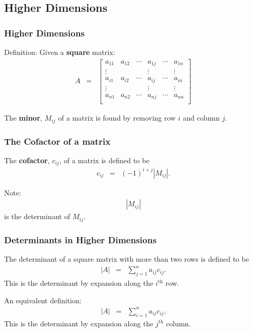 \subsection{Higher Dimensions}

\begin{frame}
  \frametitle{Higher Dimensions}

  Definition: Given a \textbf{square} matrix:
  \begin{eqnarray*}
    A & = & 
    \left[
      \begin{array}{rrr|r|rr}
        a_{11} & a_{12} & \cdots & a_{1j} & \cdots & a_{1n} \\
        \vdots &       &        & \vdots &        & \vdots \\ \hline
        a_{i1} & a_{i2} & \cdots & a_{ij} & \cdots & a_{in} \\ \hline
        \vdots &       &        & \vdots &        & \vdots \\
        a_{n1} & a_{n2} & \cdots & a_{nj} & \cdots & a_{nn} \\
      \end{array}
    \right]
  \end{eqnarray*}

  The \textbf{minor}, $M_{ij}$ of a matrix is found by removing row
  $i$ and column $j$.

\end{frame}


\begin{frame}
  \frametitle{The Cofactor of a matrix}

  The \textbf{cofactor}, $c_{ij}$, of a matrix is defined to be 
  \begin{eqnarray*}
    c_{ij} & = & (-1)^{i+j}\left| M_{ij} \right|.
  \end{eqnarray*}

  Note:
  \begin{eqnarray*}
    \left| M_{ij} \right|
  \end{eqnarray*}
  is the determinant of $M_{ij}$.

\end{frame}


\begin{frame}
  \frametitle{Determinants in Higher Dimensions}

  The determinant of a square matrix with more than two rows is
  defined to be
  \begin{eqnarray*}
    \left| A \right| & = & \sum^n_{j=1} a_{ij} c_{ij}.
  \end{eqnarray*}
  This is the determinant by expansion along the $i^{\mathrm{th}}$
  row.

  An equivalent definition:
  \begin{eqnarray*}
    \left| A \right| & = & \sum^n_{i=1} a_{ij} c_{ij}.
  \end{eqnarray*}
  This is the determinant by expansion along the $j^{\mathrm{th}}$
  column.

  

\end{frame}


